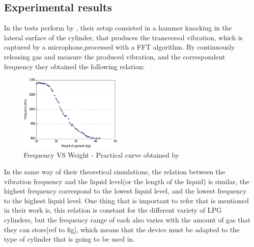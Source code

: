 \subsection{Experimental results}\label{subsec:SOAExpRes}
In the tests perform by \citeauthor{wuLiquidLevelDetector2014b}\cite{wuLiquidLevelDetector2014b}, their setup consisted in a hammer knocking in the lateral surface of the cylinder, that produces the transversal vibration, which is captured by a microphone,processed with a FFT algorithm. By continuously releasing gas and measure the produced vibration, and the correspondent frequency they obtained the following relation: 
\begin{figure}[!htb]
    \centering
    \includegraphics[width=0.45\textwidth]{Chapters/2CHP/Diagrams/weightvsfrequency.pdf}
    \caption{Frequency VS Weight - Practical curve obtained by \citeauthor{wuLiquidLevelDetector2014b}}
    \label{fig:practCurve}
\end{figure}
In the same way of their theoretical simulations, the relation between the vibration frequency and the liquid level(or the length of the liquid) is similar, the highest frequency correspond to the lowest liquid level, and the lowest frequency to the highest liquid level. One thing that is important to refer that is mentioned in their work is, this relation is constant for the different variety of LPG cylinders, but the frequency range of each also varies with the amount of gas that they can store[ref to fig], which means that the device must be adapted to the type of cylinder that is going to be used in. 
